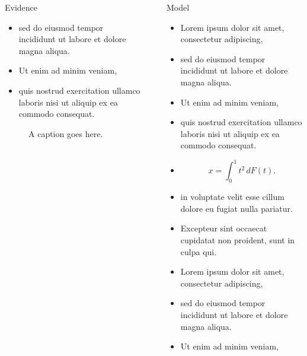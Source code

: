 \documentclass[12pt, final]{beamer}
\newlength{\sepwid}
\newlength{\onecolwid}
\newlength{\twocolwid}
\begin{document}
\begin{frame}[t]
\begin{columns}[t]
\begin{column}{\twocolwid}
\begin{columns}[t]
\begin{column}{\onecolwid}
\begin{block}{Evidence}
\begin{itemize}
              \item sed do eiusmod tempor incididunt ut labore et dolore magna aliqua.
              \item Ut enim ad minim veniam,
              \item quis nostrud exercitation ullamco laboris nisi ut aliquip ex ea commodo consequat.
            \end{itemize}
          \end{block}
          \vskip1cm
          \begin{figure}
            \label{fig:pic}
            \caption{A caption goes here.}
          \end{figure}
        \end{column}
      \end{columns}
    \end{column}
    \begin{column}{\sepwid}\end{column}
      \begin{column}{\onecolwid}
        \begin{block}{Model}
          \begin{itemize}
            \item Lorem ipsum \alert{dolor} sit amet, consectetur adipiscing,
            \item sed do eiusmod tempor incididunt ut labore et dolore magna aliqua.
            \item Ut enim ad minim veniam,
            \item quis nostrud exercitation ullamco laboris nisi ut aliquip ex ea commodo consequat.
            \item $$x = \int_0^1 t^2 \,dF(t).$$
            \item in voluptate velit \alert{esse cillum dolore} eu fugiat nulla pariatur.
            \item Excepteur sint occaecat cupidatat non proident, sunt in culpa qui.
            \item Lorem ipsum \alert{dolor} sit amet, consectetur adipiscing,
            \item sed do eiusmod tempor incididunt ut labore et dolore magna aliqua.
            \item Ut enim ad minim veniam,

\end{itemize}
\end{block}
\end{column}
\end{columns}
\end{frame}
\end{document}
